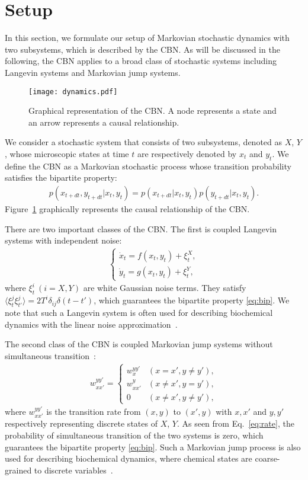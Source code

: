 \documentclass[%
 reprint,
 amsmath,amssymb,
 aps,
]{revtex4-1}
\newcommand{\balign}[1]{\begin{align} #1 \end{align}}
\newcommand{\Fref}[1]{Figure~\ref{fig:#1}}
\newcommand{\average}[1]{\ensuremath{\langle#1\rangle} }
\newcommand{\eref}[1]{Eq.~\eqref{#1}}
\theoremstyle{plain}
\begin{document}
\section{\label{sec:set}Setup}

In this section, we formulate our setup of Markovian stochastic dynamics with two subsystems, which is described by the CBN. As will be discussed in the following, the CBN applies to a broad class of stochastic systems including Langevin systems and Markovian jump systems. 

\begin{figure}[b]
\texttt{[image: dynamics.pdf]}
\caption{\label{fig:dynamics}Graphical representation of the CBN. A node represents a state and an arrow represents a causal relationship.}
\end{figure}

We consider a stochastic system that consists of two subsystems, denoted as $X$, $Y$, whose microscopic states at time $t$ are respectively denoted by $x_t$ and $y_t$. We define the CBN as a Markovian stochastic process whose transition probability satisfies the bipartite property:
\balign{
p(x_{t+dt},y_{t+dt}|x_t,y_t)=p(x_{t+dt}|x_t,y_t)p(y_{t+dt}|x_t,y_t). \label{eq:bip}
}
\Fref{dynamics} graphically represents the causal relationship of the CBN. 

There are two important classes of the CBN. The first is coupled Langevin systems with independent noise:
\balign{
\begin{cases}
\dot{x}_t=f(x_t,y_t)+\xi^X_t, \\
\dot{y}_t=g(x_t,y_t)+\xi^Y_t,
\label{eq:ls}
\end{cases}
}
where $\xi^i_t\ (i=X,Y)$ are white Gaussian noise terms. They satisfy $\average{\xi^j_t\xi^j_{t'}}=2T^i\delta_{ij}\delta(t-t')$, which guarantees the bipartite property \eqref{eq:bip}. We note that such a Langevin system is often used for describing biochemical dynamics with the linear noise approximation~\cite{VanKampen,Hayot2004}. 

The second class of the CBN is coupled Markovian jump systems without simultaneous transition~\cite{Barato2013,Barato2013(2),Barato2014,phd,Hartich2014,Hartich2016}:
\balign{
w^{yy'}_{xx'}=\begin{cases}
w^{yy'}_x & (x=x', y\neq y'), \\
w^{y}_{xx'} & (x\neq x', y=y'), \\
0 & (x\neq x', y\neq y'),
\label{eq:rate}
\end{cases}
}
where $w^{yy'}_{xx'}$ is the transition rate from $(x,y)$ to $(x',y)$ with $x,x'$ and $y,y'$ respectively representing discrete states of $X$, $Y$. As seen from \eref{eq:rate}, the probability of simultaneous transition of the two systems is zero, which guarantees the bipartite property \eqref{eq:bip}. Such a Markovian jump process is also used for describing biochemical dynamics, where chemical states are coarse-grained to discrete variables~\cite{Barato2014}.
\end{document}
